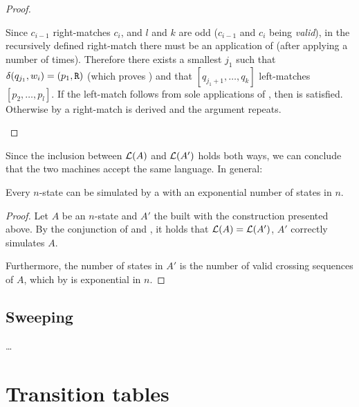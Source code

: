 \begin{proof}
\begin{description}
		      Since $c_{i-1}$ right-matches $c_i$, and $l$ and $k$ are odd ($c_{i-1}$ and $c_i$ being \emph{valid}), in the recursively defined right-match there must be an application of  (after applying  a number of times).
		      Therefore there exists a smallest $j_1$ such that $\delta(q_{j_1},w_i)=(p_1,\mathtt R)$ (which proves ) and that $[q_{j_1+1},\dots,q_k]$ left-matches $[p_2,\dots,p_l]$.
		      If the left-match follows from sole applications of , then  is satisfied.
		      Otherwise by  a right-match is derived and the argument repeats. \qedhere
	\end{description}
\end{proof}

Since the inclusion between $\mathcal L(A)$ and $\mathcal L(A')$ holds both ways, we can conclude that the two machines accept the same language.
In general:
\begin{thrm}\label{thm:2DFAto1NFA}
	Every $n$-state \TDFA can be simulated by a \ONFA with an exponential number of states in $n$.
\end{thrm}
\begin{proof}
	Let $A$ be an $n$-state \TDFA and $A'$ the \ONFA built with the construction presented above.
	By the conjunction of  and , it holds that $\mathcal L(A)=\mathcal L(A')$, \ie $A'$ correctly simulates $A$.

	Furthermore, the number of states in $A'$ is the number of valid crossing sequences of $A$, which by  is exponential in $n$.
\end{proof}



\subsection{Sweeping \TDFAs}
\dots


\section{Transition tables}\label{sec:transtab2DFA}

